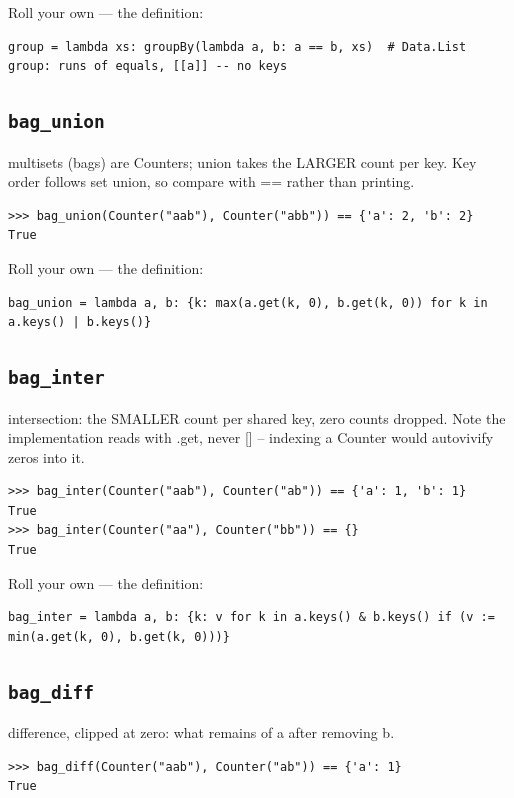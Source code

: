 \documentclass[10pt,letterpaper]{book}
\begin{document}
Roll your own --- the definition:

\begin{lstlisting}[style=ex]
group = lambda xs: groupBy(lambda a, b: a == b, xs)  # Data.List group: runs of equals, [[a]] -- no keys
\end{lstlisting}
\subsection{\texttt{bag\_union}}\label{def:bag-union}
multisets (bags) are Counters; union takes the LARGER count per key. Key order follows set union, so compare with == rather than printing.
\begin{lstlisting}[style=ex]
>>> bag_union(Counter("aab"), Counter("abb")) == {'a': 2, 'b': 2}
True
\end{lstlisting}

Roll your own --- the definition:

\begin{lstlisting}[style=ex]
bag_union = lambda a, b: {k: max(a.get(k, 0), b.get(k, 0)) for k in a.keys() | b.keys()}
\end{lstlisting}
\subsection{\texttt{bag\_inter}}\label{def:bag-inter}
intersection: the SMALLER count per shared key, zero counts dropped. Note the implementation reads with .get, never [] -- indexing a Counter would autovivify zeros into it.
\begin{lstlisting}[style=ex]
>>> bag_inter(Counter("aab"), Counter("ab")) == {'a': 1, 'b': 1}
True
>>> bag_inter(Counter("aa"), Counter("bb")) == {}
True
\end{lstlisting}

Roll your own --- the definition:

\begin{lstlisting}[style=ex]
bag_inter = lambda a, b: {k: v for k in a.keys() & b.keys() if (v := min(a.get(k, 0), b.get(k, 0)))}
\end{lstlisting}
\subsection{\texttt{bag\_diff}}\label{def:bag-diff}
difference, clipped at zero: what remains of a after removing b.
\begin{lstlisting}[style=ex]
>>> bag_diff(Counter("aab"), Counter("ab")) == {'a': 1}
True
\end{lstlisting}
\end{document}
